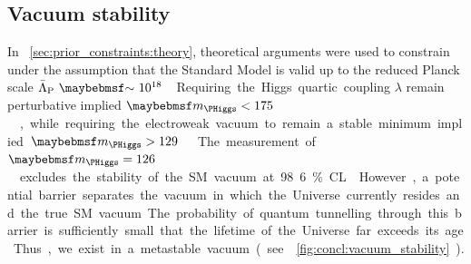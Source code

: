\subsection{Vacuum stability}
\label{sec:implications:vacuum}

In \Section~\ref{sec:prior_constraints:theory}, theoretical arguments were used to 
constrain \mH under the assumption that the Standard Model is valid up to the reduced 
Planck scale \unit{$\bar{\Lambda}_{\text{P}}~\about~10^{18}$}{\GeV}. Requiring the Higgs 
quartic coupling $\lambda$ remain perturbative implied \unit{$\mH < 175$}{\GeV}, while 
requiring the electroweak vacuum to remain a stable minimum implied 
\unit{$\mH > 129$}{\GeV} \cite{Ellis:2009}. 

The measurement of \unit{$\mH = 126$}{\GeV} excludes the stability of the SM vacuum at 
98.6\% CL \cite{Degrassi:vacuum}. However, a potential barrier separates the vacuum in 
which the Universe currently resides and the true SM vacuum. The probability of quantum 
tunnelling through this barrier is sufficiently small that the lifetime of the Universe 
far exceeds its age. Thus, we exist in a metastable vacuum (see 
\Figure~\ref{fig:concl:vacuum_stability}).

